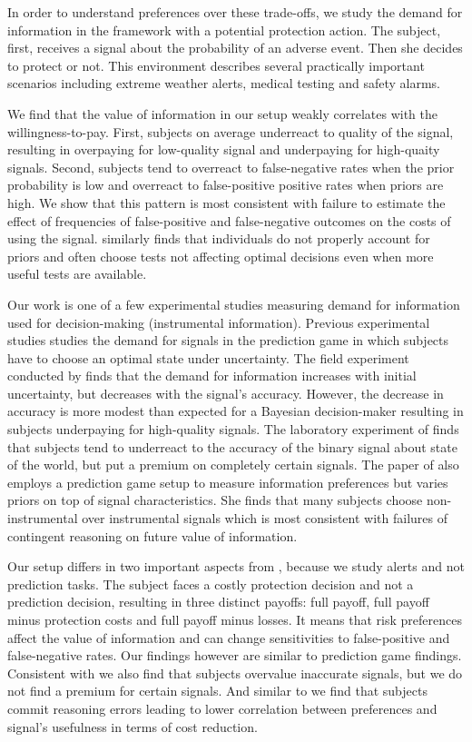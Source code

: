 \documentclass[12pt,a4paper]{article}
\begin{document}
In order to understand preferences over these trade-offs, we study the demand for information in the framework with a potential protection action. The subject, first, receives a signal about the probability of an adverse event. Then she decides to protect or not. This environment describes several practically important scenarios including extreme weather alerts, medical testing and safety alarms. 

We find that the value of information in our setup weakly correlates with the willingness-to-pay. First, subjects on average underreact to quality of the signal, resulting in overpaying for low-quality signal and underpaying for high-quaity signals. Second, subjects tend to overreact to false-negative rates when the prior probability is low and overreact to false-positive positive rates when priors are high. We show that this pattern is most consistent with failure to estimate the effect of frequencies of false-positive and false-negative outcomes on the costs of using the signal. \citep{xu_revealed_2020} similarly finds that individuals do not properly account for priors and often choose tests not affecting optimal decisions even when more useful tests are available.

Our work is one of a few experimental studies measuring demand for information used for decision-making (instrumental information). Previous experimental studies studies the demand for signals in the prediction game in which subjects have to choose an optimal state under uncertainty. The field experiment conducted by \citep{hoffman_how_2016} finds that the demand for information increases with initial uncertainty, but decreases with the signal's accuracy. However, the decrease in accuracy is more modest than expected for a Bayesian decision-maker resulting in subjects underpaying for high-quality signals. The laboratory experiment of \citet{ambuehl_belief_2018} finds that subjects tend to underreact to the accuracy of the binary signal about state of the world, but put a premium on completely certain signals. The paper of \citet{xu_revealed_2020} also employs a prediction game setup to measure information preferences but varies priors on top of signal characteristics. She finds that many subjects choose non-instrumental over instrumental signals which is most consistent with failures of contingent reasoning on future value of information.

Our setup differs in two important aspects from \citep*{ambuehl_belief_2018, xu_revealed_2020}, because we study alerts and not prediction tasks. The subject faces a costly protection decision and not a prediction decision, resulting in three distinct payoffs: full payoff, full payoff minus protection costs and full payoff minus losses. It means that risk preferences affect the value of information and can change sensitivities to false-positive and false-negative rates. Our findings however are similar to prediction game findings. Consistent with \citet{ambuehl_belief_2018} we also find that subjects overvalue inaccurate signals, but we do not find a premium for certain signals.  And similar to \citet{xu_revealed_2020} we find that subjects commit reasoning errors leading to lower correlation between preferences and signal's usefulness in terms of cost reduction.
\end{document}
